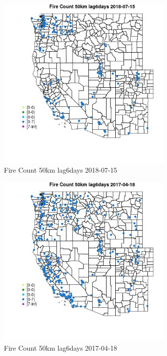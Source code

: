 \begin{figure} 
\centering  
\includegraphics[width=0.77\textwidth]{Code_Outputs/Report_ML_input_PM25_Step4_part_e_de_duplicated_aves_compiled_2019-05-21wNAs_MapObsFire_Count_50km_lag6days2018-07-15.jpg} 
\caption{\label{fig:Report_ML_input_PM25_Step4_part_e_de_duplicated_aves_compiled_2019-05-21wNAsMapObsFire_Count_50km_lag6days2018-07-15}Fire Count 50km lag6days 2018-07-15} 
\end{figure} 
 

\begin{figure} 
\centering  
\includegraphics[width=0.77\textwidth]{Code_Outputs/Report_ML_input_PM25_Step4_part_e_de_duplicated_aves_compiled_2019-05-21wNAs_MapObsFire_Count_50km_lag6days2017-04-18.jpg} 
\caption{\label{fig:Report_ML_input_PM25_Step4_part_e_de_duplicated_aves_compiled_2019-05-21wNAsMapObsFire_Count_50km_lag6days2017-04-18}Fire Count 50km lag6days 2017-04-18} 
\end{figure} 
 

